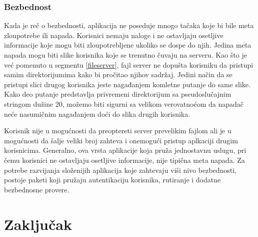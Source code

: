 \documentclass[12pt,oneside]{memoir}
\begin{document}
\newpage

\subsection{Bezbednost}

Kada je reč o bezbednosti, aplikacija ne poseduje mnogo tačaka koje bi bile meta zloupotrebe ili napada. Korisnici nemaju naloge i ne ostavljaju osetljive informacije koje mogu biti zloupotrebljene ukoliko se dospe do njih. Jedina meta napada mogu biti slike korisnika koje se trenutno čuvaju na serveru. Kao što je već pomenuto u segmentu \ref{fileserver}, fajl server ne dopušta korisniku da pristupi samim direktorijumima kako bi pročitao njihov sadržaj. Jedini način da se pristupi slici drugog korisnika jeste nagađanjem komletne putanje do same slike. Kako deo putanje predstavlja privremeni direktorijum sa pseudoslučajnim stringom dužine 20, možemo biti sigurni sa velikom verovatnoćom da napadač neće nasumičnim nagađanjem doći do slika drugih korisnika. 

Korisnik nije u mogućnosti da preoptereti server prevelikim fajlom ali je u mogućnosti da šalje veliki broj zahteva i onemogući pristup aplkaciji drugim korisnicima. Generalno, ova vrsta aplikacije koja pruža jednostavnu uslugu, pri čemu korisnici ne ostavljaju osetljive informacije, nije tipična meta napada. Za potrebe razvijanja složenijih aplikacija koje zahtevaju viši nivo bezbednosti, postoje paketi koji pružaju autentikaciju korisnika, rutiranje i dodatne bezbednosne provere. 

\chapter{Zaključak}





\printbibliography 
\backmatter
\end{document}
